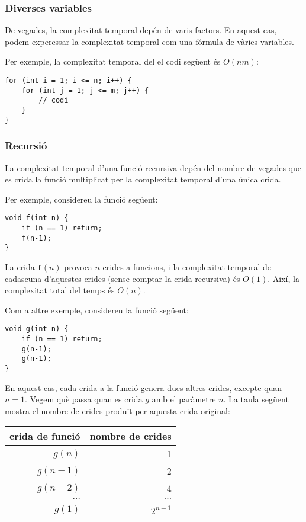 \subsubsection*{Diverses variables}

De vegades, la complexitat temporal depén de
varis factors.
En aquest cas, podem experessar la complexitat temporal
com una fórmula de vàries variables.

Per exemple, la complexitat temporal del
el codi següent és $O(nm)$:

\begin{lstlisting}
for (int i = 1; i <= n; i++) {
    for (int j = 1; j <= m; j++) {
        // codi
    }
}
\end{lstlisting}

\subsubsection*{Recursió}

La complexitat temporal d'una funció recursiva depén
del nombre de vegades que es crida la funció
multiplicat per la complexitat temporal d'una única crida.

Per exemple, considereu la funció següent:
\begin{lstlisting}
void f(int n) {
    if (n == 1) return;
    f(n-1);
}
\end{lstlisting}
La crida $\texttt{f}(n)$ provoca $n$ crides a funcions,
i la complexitat temporal de cadascuna d'aquestes crides
(sense comptar la crida recursiva) és $O(1)$.
Així, la complexitat total del temps és $O(n)$.

Com a altre exemple, considereu la funció següent:
\begin{lstlisting}
void g(int n) {
    if (n == 1) return;
    g(n-1);
    g(n-1);
}
\end{lstlisting}
En aquest cas, cada crida a la funció genera dues altres
crides, excepte quan $n=1$.
Vegem què passa quan es crida $g$
amb el paràmetre $n$.
La taula següent mostra el nombre de crides
produït per aquesta crida original:

\begin{center}
\begin{tabular}{rr}
crida de funció & nombre de crides \\
\hline
$g(n)$ & 1 \\
$g(n-1)$ & 2 \\
$g(n-2)$ & 4 \\
$\cdots$ & $\cdots$ \\
$g(1)$ & $2^{n-1}$ \\
\end{tabular}
\end{center}

